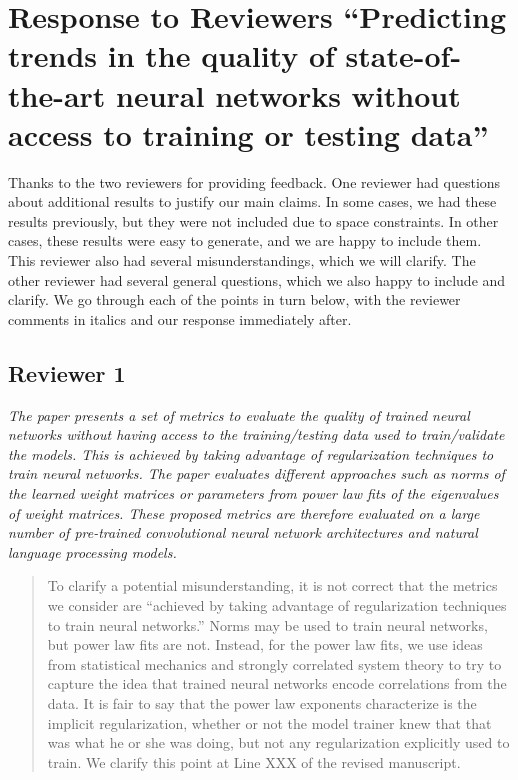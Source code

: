 \documentclass[11pt]{article}
\begin{document}
\section*{Response to Reviewers
``Predicting trends in the quality of state-of-the-art neural networks without access to training or testing data''
}

Thanks to the two reviewers for providing feedback.
One reviewer had questions about additional results to justify our main claims.
In some cases, we had these results previously, but they were not included due to space constraints.
In other cases, these results were easy to generate, and we are happy to include them.
This reviewer also had several misunderstandings, which we will clarify.
The other reviewer had several general questions, which we also happy to include and clarify.
We go through each of the points in turn below, with the reviewer comments in italics and our response immediately after.


\subsection*{Reviewer 1}

\emph{%
The paper presents a set of metrics to evaluate the quality of trained neural networks without having access to the training/testing data used to train/validate the models. 
This is achieved by taking advantage of regularization techniques to train neural networks. 
The paper evaluates different approaches such as norms of the learned weight matrices or parameters from power law fits of the eigenvalues of weight matrices. 
These proposed metrics are therefore evaluated on a large number of pre-trained convolutional neural network architectures and natural language processing models.
}

\begin{quote}
To clarify a potential misunderstanding, it is not correct that the metrics we consider are
``achieved by taking advantage of regularization techniques to train neural networks.'' 
Norms may be used to train neural networks, but power law fits are not.
Instead, for the power law fits, we use ideas from statistical mechanics and strongly correlated system theory to try to capture the idea that trained neural networks encode correlations from the data.
It is fair to say that the power law exponents characterize is the implicit regularization, whether or not the model trainer knew that that was what he or she was doing, but not any regularization explicitly used to train.
We clarify this point at Line XXX of the revised manuscript.
\end{quote}
\end{document}
